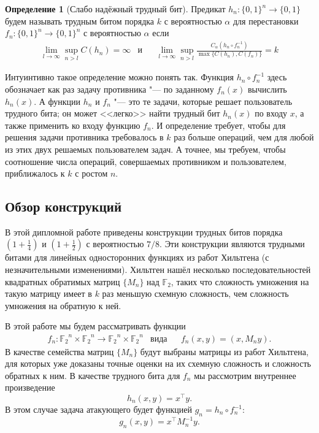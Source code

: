 \documentclass[oneside, a4paper]{article}
\theoremstyle{definition}
\newtheorem{definition}{Определение}
\theoremstyle{remark}
\newcommand\F{\ensuremath{{\mathbb F}_2}}
\begin{document}
\begin{definition}[Слабо надёжный трудный бит]
Предикат $h_n : \{0, 1\}^n \to \{0, 1\}$ будем называть трудным битом порядка
$k$ с вероятностью $\alpha$ для перестановки $f_n : \{0, 1\}^n \to \{0, 1\}^n$ с
вероятностью $\alpha$ если
\[
\begin{aligned}
&\lim_{l \to \infty} \sup_{n > l} C(h_n) = \infty
&
\text{и}&
&
\lim_{l \to \infty} \sup_{n > l} \frac {C_\alpha(h_n \circ f_n^{-1})} {\max \{ C(h_n), C(f_n) \}} = k&
\end{aligned}
\]
\end{definition}

Интуинтивно такое определение можно понять так. Функция $h_n \circ f_n^{-1}$
здесь обозначает как раз задачу противника "--- по заданному $f_n(x)$ вычислить
$h_n(x)$. А функции $h_n$ и $f_n$ "--- это те задачи, которые решает
пользователь трудного бита; он может <<легко>> найти трудный бит $h_n(x)$ по
входу $x$, а также применить ко входу функцию $f_n$. И определение требует,
чтобы для решения задачи противника требовалось в $k$ раз больше операций, чем
для любой из этих двух решаемых пользователем задач. А точнее, мы требуем, чтобы
соотношение числа операций, совершаемых противником и пользователем,
приближалось к $k$ с ростом $n$.

\subsection{Обзор конструкций}

В этой дипломной работе приведены конструкции трудных битов порядка $(1
+ \frac 1 4)$ и $(1 + \frac 1 2)$ с вероятностью $7/8$. Эти конструкции
являются трудными битами для линейных односторонних функциях из работ Хильтгена
\cite{hiltgen1993} (с незначительными изменениями). Хильтген нашёл несколько
последовательностей квадратных обратимых матриц $\{M_n\}$ над $\F$, таких что
сложность умножения на такую матрицу имеет в $k$ раз меньшую схемную сложность,
чем сложность умножения на обратную к ней.

В этой работе мы будем рассматривать функции
\[
\begin{aligned}
&f_n : \F^n \times \F^n \to \F^n \times \F^n
&
\text{вида}&
&
f_n(x, y) = (x, M_n y).&
\end{aligned}
\]
В качестве семейства матриц
$\{M_n\}$ будут выбраны матрицы из работ Хильтгена, для которых уже доказаны
точные оценки на их схемную сложность и сложность обратных к ним. В качестве
трудного бита для $f_n$ мы рассмотрим внутреннее произведение \[
h_n(x, y) = x^\top y.
\]
В этом случае задача атакующего будет функцией $g_n = h_n \circ f_n^{-1}$:
\[
g_n(x, y) = x^\top M_n^{-1} y.
\]
\end{document}
